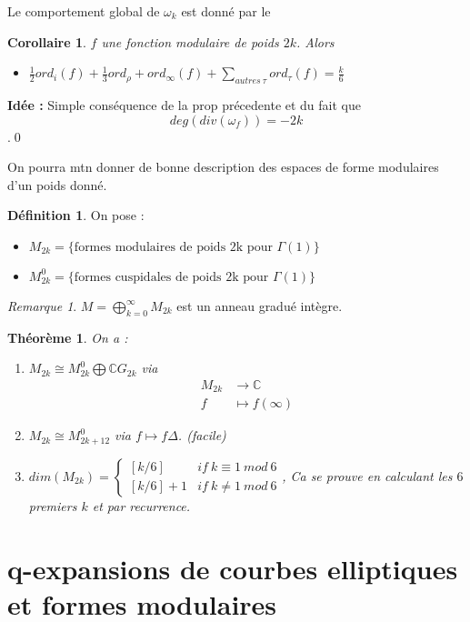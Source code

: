 \documentclass[12pt]{article}
\theoremstyle{plain}
\newtheorem{thm}[subsubsection]{Th\'eor\`eme}
\newtheorem{cor}[subsubsection]{Corollaire}
\theoremstyle{definition}
\newtheorem{defn}[subsubsection]{D\'efinition}
\theoremstyle{remark}
\newtheorem{rem}{Remarque}
\newcommand{\C}{\mathbb{C}}
\newcommand{\w}{\omega}
\begin{document}
Le comportement global de $\w_k$ est donné par le
\begin{cor}
    $f$ une fonction modulaire de poids $2k$. Alors
    \begin{itemize}
        \item $\frac{1}{2}ord_i(f)+\frac{1}{3}ord_{\rho}+ord_{\infty}(f)+\sum_{autres~\tau}ord_{\tau}(f)=\frac{k}{6}$
    \end{itemize}
\end{cor}
\textbf{Idée :} Simple conséquence de la prop précedente et du fait que $$deg(div(\w_f))=-2k$$.\qed

On pourra mtn donner de bonne description des espaces de forme modulaires d'un poids donné. 
\begin{defn}On pose :
    \begin{itemize}
        \item $M_{2k}=\{\text{formes modulaires de poids 2k pour }\Gamma(1)\}$
        \item $M_{2k}^{0}=\{\text{formes cuspidales de poids 2k pour }\Gamma(1)\}$
    \end{itemize}
\end{defn}

\begin{rem}
    $M=\bigoplus_{k=0}^{\infty}M_{2k}$ est un anneau gradué intègre. 
\end{rem}

\begin{thm}
    On a  :
    \begin{enumerate}
        \item $M_{2k}\cong M_{2k}^0\bigoplus\C G_{2k}$ via \begin{align*}
            M_{2k}&\rightarrow \C\\
            f&\mapsto f(\infty)
        \end{align*}
        \item $M_{2k}\cong M_{2k+12}^0$ via $f\mapsto f\Delta$. (facile)
        \item $dim(M_{2k})=\begin{cases}
            [k/6] &if~k\equiv 1~mod~6\\
            [k/6]+1 &if~k\neq  1~mod~6
        \end{cases}$, Ca se prouve en calculant les $6$ premiers $k$ et par recurrence.
    \end{enumerate}
\end{thm}

\section{q-expansions de courbes elliptiques et formes modulaires}
\end{document}

